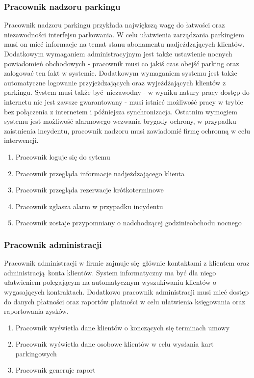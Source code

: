 \documentclass[paper=a4, fontsize=11pt]{scrartcl} %
\begin{document}
\subsubsection{Pracownik nadzoru parkingu}

Pracownik nadzoru parkingu przykłada największą wagę do łatwości oraz niezawodności interfejsu parkowania.
W celu ułatwienia zarządzania parkingiem musi on mieć informacje na temat stanu abonamentu nadjeżdzających klientów.
Dodatkowym wymaganiem administracyjnym jest także ustawienie nocnych powiadomień obchodowych - pracownik musi co jakiś czas
obejść parking oraz zalogować ten fakt w systemie. Dodatkowym wymaganiem systemu jest także automatyczne logowanie przyjeżdzających
oraz wyjeżdżających klientów z parkingu. System musi także być niezawodny - w wyniku natury pracy dostęp do internetu nie jest zawsze
gwarantowany - musi istnieć możliwość pracy w trybie bez połączenia z internetem i późniejsza synchronizacja.
Ostatnim wymogiem systemu jest możliwość alarmowego wezwania brygady ochrony, w przypadku zaistnienia incydentu, pracownik
nadzoru musi zawiadomić firmę ochronną w celu interwencji.

\begin{enumerate}
  \item Pracownik loguje się do sytemu
  \item Pracownik przegląda informacje nadjeżdzającego klienta
  \item Pracownik przegląda rezerwacje krótkoterminowe
  \item Pracownik zgłasza alarm w przypadku incydentu
  \item Pracownik zostaje przypomniany o nadchodzącej godzinieobchodu nocnego
\end{enumerate}

\subsubsection{Pracownik administracji}

Pracownik administracji w firmie zajmuje się głównie kontaktami z klientem oraz administracją konta klientów.
System informatyczny ma być dla niego ułatwieniem polegającym na automatycznym wyszukiwaniu klientów o wygasających kontraktach.
Dodatkowo pracownik administracji musi mieć dostęp do danych płatności oraz raportów płatności w celu ułatwienia księgowania
oraz raportowania zysków.

\begin{enumerate}
  \item Pracownik wyświetla dane klientów o konczących się terminach umowy 
  \item Pracownik wyświetla dane osobowe klientów w celu wysłania kart parkingowych
  \item Pracownik generuje raport
\end{enumerate}
\end{document}
